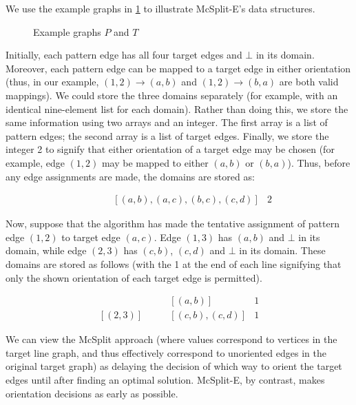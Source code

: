 We use the example graphs in \cref{fig:splitp-example} to illustrate McSplit-E's data structures.
\begin{figure}[htb]
    \centering
    
    \caption{Example graphs $P$ and $T$}
    \label{fig:splitp-example}
\end{figure}

Initially, each pattern edge has all four
target edges and $\bot$ in its domain.  Moreover, each pattern edge can be mapped to a target edge in either orientation
(thus, in our example, $(1,2) \rightarrow (a,b)$ and $(1,2) \rightarrow (b,a)$ are both valid mappings). 
We could store the three domains separately (for example, with an identical nine-element list for each domain).
Rather than doing this, we store the same
information using two arrays and an integer.  The first array is a list of pattern edges;
the second array is a list of target edges. Finally, we store the integer 2 to signify that either orientation of a
target edge may be chosen (for example, edge $(1,2)$ may be mapped to either $(a,b)$ or $(b,a)$).
Thus, before any edge assignments are made, the domains are stored as:

\begin{align*}
    [(1,2), (1,3), (2,3)] & \qquad [(a,b), (a,c), (b,c), (c,d)] & 2
\end{align*}

Now, suppose that the algorithm has made the tentative assignment of pattern edge $(1,2)$ to target edge $(a,c)$.
Edge $(1,3)$ has $(a,b)$ and $\bot$ in its domain, while edge $(2,3)$ has $(c,b)$, $(c,d)$
and $\bot$ in its domain.  These domains are stored as follows (with the 1 at the end of
each line signifying that only the shown orientation of each target edge is permitted).

\begin{align*}
    [(1,3)] & \qquad [(a,b)]        & 1 \\
    [(2,3)] & \qquad [(c,b), (c,d)] & 1
\end{align*}

We can view the McSplit approach (where values correspond to vertices in the target line graph, and
thus effectively correspond to unoriented edges in the original target graph)
as delaying the decision of which way to orient the target
edges until after finding an optimal solution.
McSplit-E, by contrast, makes orientation decisions as early as possible.


